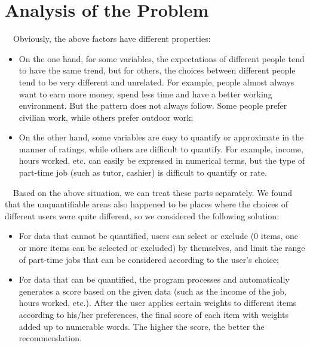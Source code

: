 \documentclass[12pt]{article}
\begin{document}
\section{Analysis of the Problem}
    ~~Obviously, the above factors have different properties:
    \begin{itemize}
        \item On the one hand, for some variables, the expectations of different people tend to have the same trend, but for others, the choices between different people tend to be very different and unrelated. For example, people almost always want to earn more money, spend less time and have a better working environment. But the pattern does not always follow. Some people prefer civilian work, while others prefer outdoor work;
        \item On the other hand, some variables are easy to quantify or approximate in the manner of ratings, while others are difficult to quantify. For example, income, hours worked, etc. can easily be expressed in numerical terms, but the type of part-time job (such as tutor, cashier) is difficult to quantify or rate.
    \end{itemize}
    ~~Based on the above situation, we can treat these parts separately. We found that the unquantifiable areas also happened to be places where the choices of different users were quite different, so we considered the following solution:
    ~~\begin{itemize}
        \item For data that cannot be quantified, users can select or exclude (0 items, one or more items can be selected or excluded) by themselves, and limit the range of part-time jobs that can be considered according to the user's choice;
        \item For data that can be quantified, the program processes and automatically generates a score based on the given data (such as the income of the job, hours worked, etc.). After the user applies certain weights to different items according to his/her preferences, the final score of each item with weights added up to numerable words. The higher the score, the better the recommendation.
    \end{itemize}
\end{document}
